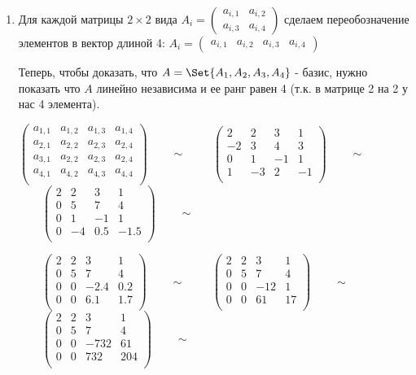 \begin{enumerate}
    \item Для каждой матрицы $2 \times 2$ вида
	$A_i = \begin{pmatrix}a_{i, 1} & a_{i, 2} \\ a_{i, 3} & a_{i, 4}\end{pmatrix}$
	сделаем переобозначение элементов в вектор длиной 4:
	$A_i = \begin{pmatrix}a_{i, 1} & a_{i,2} & a_{i,3} & a_{i,4}\end{pmatrix}$

	Теперь, чтобы доказать, что $A = \Set{A_1, A_2, A_3, A_4}$ - базис,
	нужно показать что $A$ линейно независима и ее ранг равен 4 (т.к. в матрице 2 на 2 у нас 4 элемента).

	$\begin{pmatrix}
	a_{1, 1} & a_{1,2} & a_{1,3} & a_{1,4}\\
	a_{2, 1} & a_{2,2} & a_{2,3} & a_{2,4}\\
	a_{3, 1} & a_{2,2} & a_{2,3} & a_{2,4}\\
	a_{4, 1} & a_{4,2} & a_{4,3} & a_{4,4}\\
	\end{pmatrix}\qquad \sim $
	$\qquad\begin{pmatrix}
	2 & 2 & 3 & 1\\
	-2 & 3 & 4 & 3\\
	0 & 1 & -1 & 1\\
	1 & -3 & 2 & -1\\
	\end{pmatrix}\qquad \sim $
	$\qquad\begin{pmatrix}
	2 & 2 & 3 & 1\\
	0 & 5 & 7 & 4\\
	0 & 1 & -1 & 1\\
	0 & -4 & 0.5 & -1.5\\
	\end{pmatrix}\qquad \sim $

	$\qquad\begin{pmatrix}
	2 & 2 & 3 & 1\\
	0 & 5 & 7 & 4\\
	0 & 0 & -2.4 & 0.2\\
	0 & 0 & 6.1 & 1.7\\
	\end{pmatrix}\qquad \sim $
	$\qquad\begin{pmatrix}
	2 & 2 & 3 & 1\\
	0 & 5 & 7 & 4\\
	0 & 0 & -12 & 1\\
	0 & 0 & 61 & 17\\
	\end{pmatrix}\qquad \sim $
	$\qquad\begin{pmatrix}
	2 & 2 & 3 & 1\\
	0 & 5 & 7 & 4\\
	0 & 0 & -732 & 61\\
	0 & 0 & 732 & 204\\
	\end{pmatrix}\qquad \sim $


\end{enumerate}
